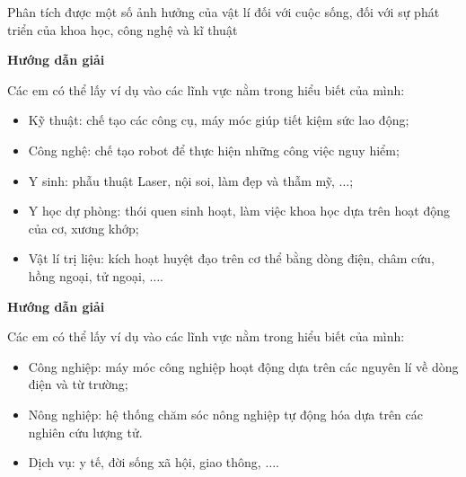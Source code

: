 \begin{dang}{Phân tích được một số ảnh hưởng của vật lí đối với cuộc sống, đối với sự phát triển của khoa học, công nghệ và kĩ thuật}
	{	\begin{center}
			\textbf{Hướng dẫn giải}
		\end{center}
		
		Các em có thể lấy ví dụ vào các lĩnh vực nằm trong hiểu biết của mình:
		\begin{itemize}
			\item Kỹ thuật: chế tạo các công cụ, máy móc giúp tiết kiệm sức lao động;
			\item Công nghệ: chế tạo robot để thực hiện những công việc nguy hiểm;
			\item Y sinh: phẫu thuật Laser, nội soi, làm đẹp và thẫm mỹ, $\ldots$; 
			\item Y học dự phòng: thói quen sinh hoạt, làm việc khoa học dựa trên hoạt động của cơ, xương khớp;
			\item Vật lí trị liệu: kích hoạt huyệt đạo trên cơ thể bằng dòng điện, châm cứu, hồng ngoại, tử ngoại, $\ldots$.
		\end{itemize}
	}
	{\begin{center}
			\textbf{Hướng dẫn giải}
		\end{center}
		
		Các em có thể lấy ví dụ vào các lĩnh vực nằm trong hiểu biết của mình:
		\begin{itemize}
			\item Công nghiệp: máy móc công nghiệp hoạt động dựa trên các nguyên lí về dòng điện và từ trường;
			\item Nông nghiệp: hệ thống chăm sóc nông nghiệp tự động hóa dựa trên các nghiên cứu lượng tử.
			\item Dịch vụ: y tế, đời sống xã hội, giao thông, $\ldots$.
		\end{itemize}
	}
\end{dang}

